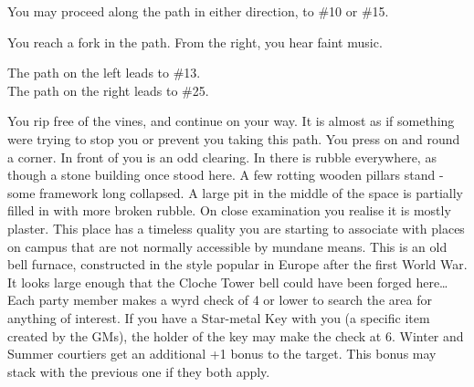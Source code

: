 \documentclass[white]{gl2018}
\begin{document}
\begin{large}
\begin{location}{32}
\begin{fromhere}
You may proceed along the path in either direction, to \#10 or \#15.
\end{fromhere}
\end{location}
\begin{location}{33}
You reach a fork in the path.  From the right, you hear faint music.
\begin{fromhere}The path on the left leads to \#13.\\
The path on the right leads to \#25.
\end{fromhere}
\end{location}
\begin{location}{34}
You rip free of the vines, and continue on your way. It is almost as if something were trying to stop you or prevent you taking this path. You press on and round a corner. In front of you is an odd clearing. In there is rubble everywhere, as though a stone building once stood here. A few rotting wooden pillars stand - some framework long collapsed. A large pit in the middle of the space is partially filled in with more broken rubble. On close examination you realise it is mostly plaster. This place has a timeless quality you are starting to associate with places on campus that are not normally accessible by mundane means. This is an old bell furnace, constructed in the style popular in Europe after the first World War. It looks large enough that the Cloche Tower bell could have been forged here… Each party member makes a wyrd check of 4 or lower to search the area for anything of interest. If you have a Star-metal Key with you (a specific item created by the GMs), the holder of the key may make the check at 6. Winter and Summer courtiers get an additional +1 bonus to the target. This bonus may stack with the previous one if they both apply. 


\end{location}
\end{large}
\end{document}
